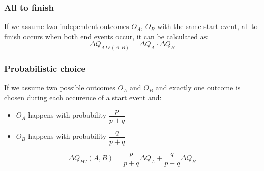     \subsubsection{All to finish}
        If we assume two independent outcomes $O_A$, $O_B$ with the same start event, all-to-finish occurs when both end events occur, it can be calculated as:
        \begin{equation}
            \Delta Q_{ATF(A, B)} = \Delta Q_A \cdot \Delta Q_B 
            \label{eq:atf}
        \end{equation}
        \subsubsection{Probabilistic choice}
        If we assume two possible outcomes $O_A$ and $O_B$ and exactly one outcome is chosen during each occurence of a start event and:
        \begin{itemize}
            \item $O_A$ happens with probability $\dfrac{p}{p+q}$
            \item $O_B$ happens with probability $\dfrac{q}{p + q}$
        \end{itemize}
        \begin{equation}
           \Delta Q_{PC}(A, B) = \dfrac{p}{p + q}\Delta Q_A + \dfrac{q}{p + q}\Delta Q_B 
            \label{eq:pc}
        \end{equation} 

   
